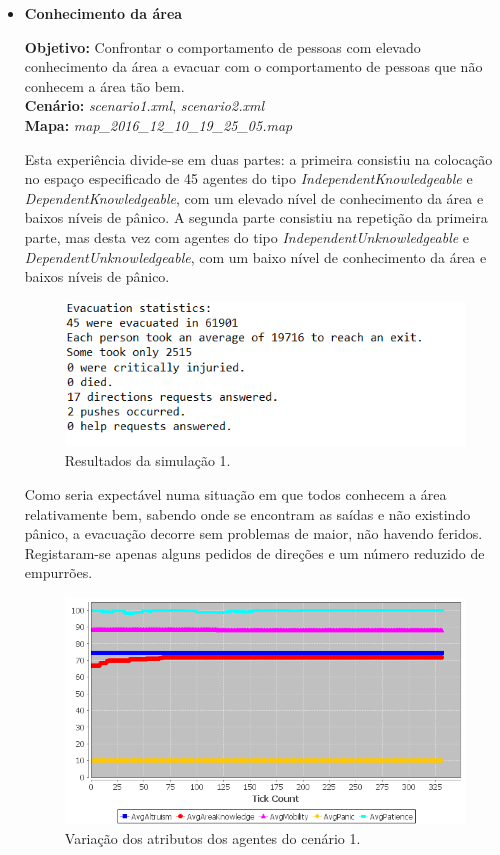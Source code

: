 \documentclass[12pt]{article}
\begin{document}
\begin{titlepage}
\begin{itemize}
	\item \textbf{Conhecimento da área}

\textbf{Objetivo:} 
Confrontar o comportamento de pessoas com elevado conhecimento da área a evacuar com o comportamento de pessoas que não conhecem a área tão bem.
\\\textbf{Cenário:} 
\textit{scenario1.xml}, \textit{scenario2.xml}
\\\textbf{Mapa:} 
\textit{map\_2016\_12\_10\_19\_25\_05.map}
\newline


Esta experiência divide-se em duas partes: a primeira consistiu na colocação no espaço especificado de 45 agentes do tipo \textit{IndependentKnowledgeable} e \textit{DependentKnowledgeable}, com um elevado nível de conhecimento da área e baixos níveis de pânico. A segunda parte consistiu na repetição da primeira parte, mas desta vez com agentes do tipo \textit{IndependentUnknowledgeable} e \textit{DependentUnknowledgeable}, com um baixo nível de conhecimento da área e  baixos níveis de pânico.

\begin{figure}[H]
	\centering
	\includegraphics{log_sc1.png}
	\caption{Resultados da simulação 1.}
	\label{log_sc1}
\end{figure}

Como seria expectável numa situação em que todos conhecem a área relativamente bem, sabendo onde se encontram as saídas e não existindo pânico, a evacuação decorre sem problemas de maior, não havendo feridos. Registaram-se apenas alguns pedidos de direções e um número reduzido de empurrões.

\begin{figure}[H]
	\centering
	\includegraphics{graph_sc1.png}
	\caption{Variação dos atributos dos agentes do cenário 1.}
	\label{graph_sc1}
\end{figure}


\end{itemize}
\end{titlepage}
\end{document}
